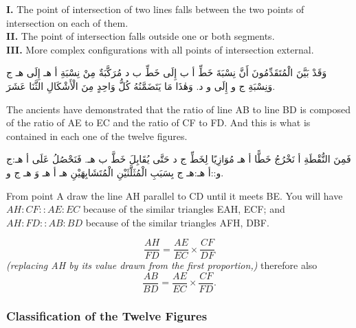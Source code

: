 \documentclass[11pt,a4paper]{article}
\theoremstyle{plain}
\theoremstyle{definition}
\theoremstyle{remark}
\newcommand{\ar}[1]{{\arabicfont\beginR #1\endR}}
\newcommand{\bilingualpair}[2]{%
  \par\noindent
  \begin{minipage}[t]{0.48\textwidth}
  #1
  \end{minipage}%
  \hfill
  \begin{minipage}[t]{0.48\textwidth}
  \vspace*{0pt}#2
  \end{minipage}\par\vspace{0.3cm}%
}
\begin{document}
\begin{center}
\textbf{I.} The point of intersection of two lines falls between the two points of intersection on each of them.\\[0.3cm]
\textbf{II.} The point of intersection falls outside one or both segments.\\[0.3cm]
\textbf{III.} More complex configurations with all points of intersection external.\\[0.3cm]
\end{center}

\vspace{0.3cm}

\bilingualpair{\ar{وَقَدْ بَيَّنَ الْمُتَقَدِّمُونَ أَنَّ نِسْبَةَ خَطِّ أ ب إِلَى خَطِّ ب د مُرَكَّبَةٌ مِنْ نِسْبَةِ أ هـ إِلَى هـ ج وَنِسْبَةِ ج و إِلَى و د. وَهٰذَا مَا يَتَضَمَّنُهُ كُلُّ وَاحِدٍ مِنَ الْأَشْكَالِ الثَّنَا عَشَرَ.}}{\noindent The ancients have demonstrated that the ratio of line AB to line BD is composed of the ratio of AE to EC and the ratio of CF to FD. And this is what is contained in each one of the twelve figures.}

\vspace{0.3cm}

\bilingualpair{\ar{فَمِنَ النُّقْطَةِ أ نَخْرُجُ خَطًّا أ هـ مُوَازِيًا لِخَطِّ ج د حَتَّى يُقَابِلَ خَطَّ ب هـ. فَنَحْصُلُ عَلَى أ هـ:ج و::أ هـ:هـ ج بِسَبَبِ الْمُثَلَّثَيْنِ الْمُتَشَابِهَيْنِ هـ أ هـ وَ هـ ج و.}}{From point A draw the line AH parallel to CD until it meets BE. You will have $AH : CF :: AE : EC$ because of the similar triangles EAH, ECF; and $AH : FD :: AB : BD$ because of the similar triangles AFH, DBF.}

\begin{center}
\[
\frac{AH}{FD} = \frac{AE}{EC} \times \frac{CF}{DF}
\]
\textit{(replacing AH by its value drawn from the first proportion,)} therefore also
\[
\frac{AB}{BD} = \frac{AE}{EC} \times \frac{CF}{FD}.
\]
\end{center}

\subsubsection*{Classification of the Twelve Figures}
\end{document}
